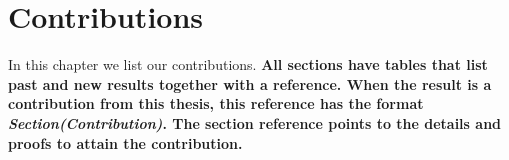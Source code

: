 \chapter{Contributions}

In this chapter we list our contributions.
%
\textbf{%
All sections have tables that list
past and new results together with a reference.
When the result is a
contribution from this thesis, this reference has the format
\emph{Section(Contribution)}. The section reference points to the
details and proofs to attain the contribution.%
}





